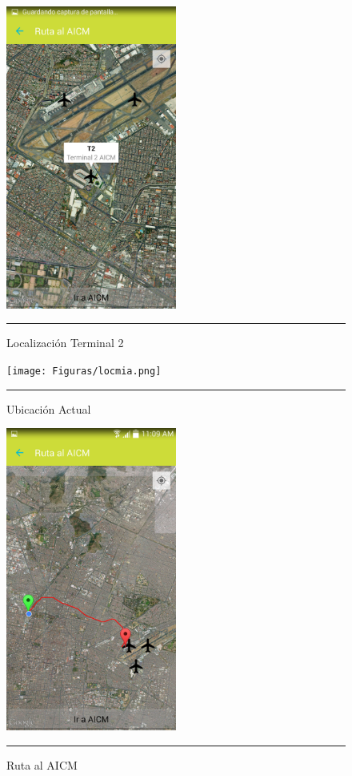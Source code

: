 \begin{figure}[h]
	\centering
		\includegraphics[width=0.5\textwidth]{Figuras/loct2.png}
		\rule{30em}{0.5pt}
	\caption[Localización Terminal 2]{Localización Terminal 2}
	\label{fig:localizacionT2}
\end{figure}

\begin{figure}[h]
	\centering
		\texttt{[image: Figuras/locmia.png]}
		\rule{30em}{0.5pt}
	\caption[Ubicación Actual]{Ubicación Actual}
	\label{fig:miUbicacion}
\end{figure}

\begin{figure}[h]
	\centering
		\includegraphics[width=0.5\textwidth]{Figuras/ruta.png}
		\rule{30em}{0.5pt}
	\caption[Ruta al AICM]{Ruta al AICM}
	\label{fig:rutaAICM}
\end{figure}
\clearpage

